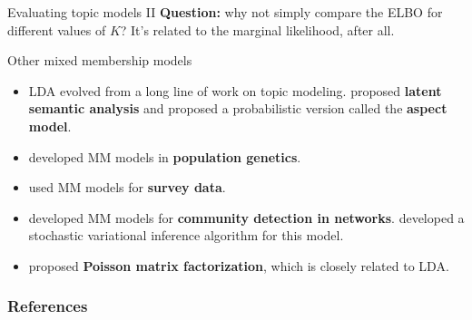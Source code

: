 \documentclass[aspectratio=169]{beamer}
\begin{document}
\begin{frame}[t]{Evaluating topic models II}
\textbf{Question: } why not simply compare the ELBO for different values of $K$? It's related to the marginal likelihood, after all. 
\end{frame}


\begin{frame}{Other mixed membership models}
\begin{itemize}
    \item LDA evolved from a long line of work on topic modeling. \citet{Deerwester1990-kp} proposed \textbf{latent semantic analysis} and \citet{Hofmann1999-de} proposed a probabilistic version called the \textbf{aspect model}.
    
    \item \citet{Pritchard2000-wm} developed MM models in \textbf{population genetics}.
    
    \item \citet{Erosheva2007-vd} used MM models for \textbf{survey data}.
    
    \item \citet{Airoldi2008-rh} developed MM models for \textbf{community detection in networks}. \citet{Gopalan2013-pz} developed a stochastic variational inference algorithm for this model.
    
    \item \citet{Gopalan2013-bc} proposed \textbf{Poisson matrix factorization}, which is closely related to LDA. 
\end{itemize}
\end{frame}

\begin{frame}[t,allowframebreaks]
        \frametitle{References}
        
        
\end{frame}
\end{document}
